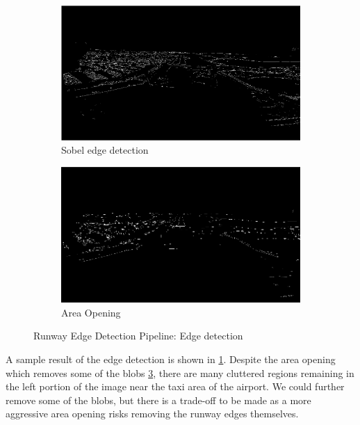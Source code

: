 \documentclass[letterpaper, conference]{IEEEtran}  %
\begin{document}
\begin{figure}
\centering
\begin{subfigure}{0.85 \textwidth}
	\includegraphics[width= \textwidth]{sobel.png} 
	\caption{\label{fig:sobel}  Sobel edge detection}
\end{subfigure}
\begin{subfigure}{0.85 \textwidth}
    \centering
	\includegraphics[width= \textwidth]{sobel_open.png} 
	\caption{\label{fig:sobelopen}Area Opening}
\end{subfigure}
\caption{Runway Edge Detection Pipeline: Edge detection}
\end{figure}

A sample result of the edge detection is shown in \cref{fig:sobel}. Despite the area opening which removes some of the blobs \cref{fig:sobelopen}, there are many cluttered regions remaining in the left portion of the image near the taxi area of the airport. We could further remove some of the blobs, but there is a trade-off to be made as a more aggressive area opening risks removing the runway edges themselves. 

\newpage
\end{document}

